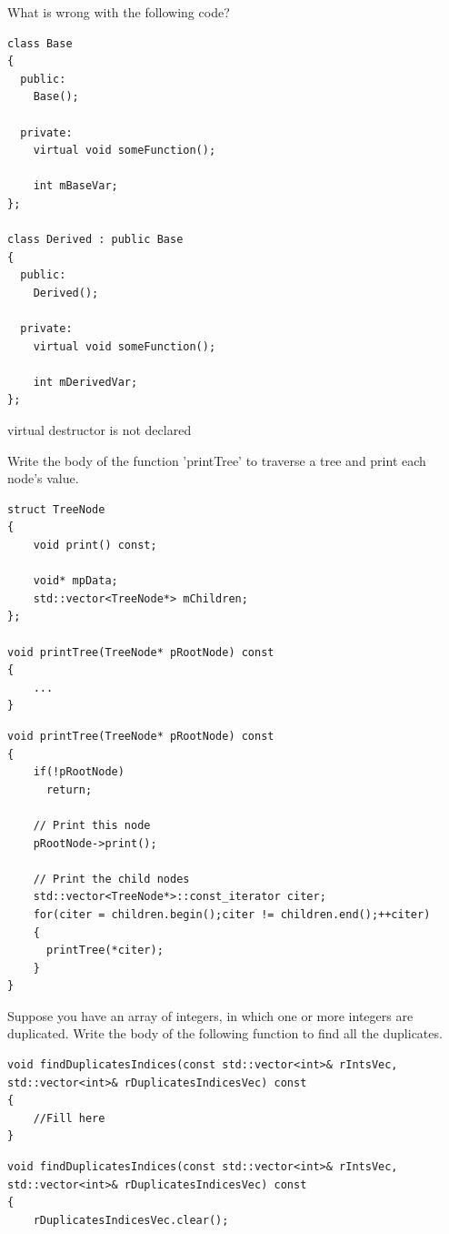 \documentclass{exam}%
\begin{document}
\begin{questions}
\question What is wrong with the following code?
\begin{lstlisting}
class Base
{
  public:
    Base();

  private:
    virtual void someFunction();

    int mBaseVar;
};

class Derived : public Base
{
  public:
    Derived();

  private:
    virtual void someFunction();

    int mDerivedVar;
};
\end{lstlisting}
\begin{solution}[.2in]
virtual destructor is not declared
\end{solution}

\question Write the body of the function 'printTree' to traverse a tree and print each node’s value.
\begin{lstlisting}
struct TreeNode
{
    void print() const;

    void* mpData;
    std::vector<TreeNode*> mChildren;
};

void printTree(TreeNode* pRootNode) const
{
    ...
}
\end{lstlisting}
\begin{solution}[.2in]
\begin{lstlisting}
void printTree(TreeNode* pRootNode) const
{
    if(!pRootNode)
      return;

    // Print this node
    pRootNode->print();

    // Print the child nodes
    std::vector<TreeNode*>::const_iterator citer;
    for(citer = children.begin();citer != children.end();++citer)
    {
      printTree(*citer);
    }
}
\end{lstlisting}
\end{solution}

\question Suppose you have an array of integers, in which one or more integers are duplicated.
Write the body of the following function to find all the duplicates.
\begin{lstlisting}
void findDuplicatesIndices(const std::vector<int>& rIntsVec, 
std::vector<int>& rDuplicatesIndicesVec) const
{
    //Fill here
}
\end{lstlisting}
\begin{solution}[.2in]
\begin{lstlisting}
void findDuplicatesIndices(const std::vector<int>& rIntsVec,
std::vector<int>& rDuplicatesIndicesVec) const
{
    rDuplicatesIndicesVec.clear();


\end{lstlisting}
\end{solution}
\end{questions}
\end{document}
